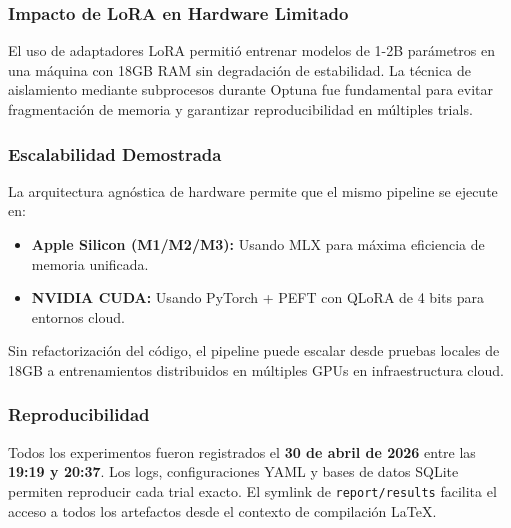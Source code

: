 \subsubsection{Impacto de LoRA en Hardware Limitado}

El uso de adaptadores LoRA permitió entrenar modelos de 1-2B parámetros en una máquina con 18GB RAM sin degradación de estabilidad. La técnica de aislamiento mediante subprocesos durante Optuna fue fundamental para evitar fragmentación de memoria y garantizar reproducibilidad en múltiples trials.

\subsubsection{Escalabilidad Demostrada}

La arquitectura agnóstica de hardware permite que el mismo pipeline se ejecute en:
\begin{itemize}
    \item \textbf{Apple Silicon (M1/M2/M3):} Usando MLX para máxima eficiencia de memoria unificada.
    \item \textbf{NVIDIA CUDA:} Usando PyTorch + PEFT con QLoRA de 4 bits para entornos cloud.
\end{itemize}

Sin refactorización del código, el pipeline puede escalar desde pruebas locales de 18GB a entrenamientos distribuidos en múltiples GPUs en infraestructura cloud.

\subsubsection{Reproducibilidad}

Todos los experimentos fueron registrados el \textbf{30 de abril de 2026} entre las \textbf{19:19 y 20:37}. Los logs, configuraciones YAML y bases de datos SQLite permiten reproducir cada trial exacto. El symlink de \texttt{report/results} facilita el acceso a todos los artefactos desde el contexto de compilación LaTeX.

